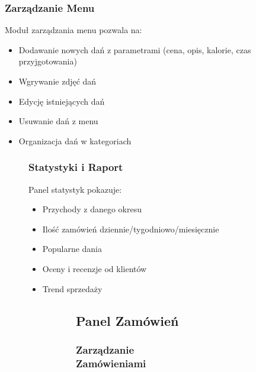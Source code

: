 \documentclass[12pt,a4paper,utf-8]{article}
\begin{document}
\begin{figure}[H]
    \centering

\subsubsection{Zarządzanie Menu}

Moduł zarządzania menu pozwala na:

\begin{itemize}
    \item Dodawanie nowych dań z parametrami (cena, opis, kalorie, czas przyjgotowania)
    \item Wgrywanie zdjęć dań
    \item Edycję istniejących dań
    \item Usuwanie dań z menu
    \item Organizacja dań w kategoriach
\end{itemize}

\begin{figure}[H]
    \centering

\subsubsection{Statystyki i Raport}

Panel statystyk pokazuje:

\begin{itemize}
    \item Przychody z danego okresu
    \item Ilość zamówień dziennie/tygodniowo/miesięcznie
    \item Popularne dania
    \item Oceny i recenzje od klientów
    \item Trend sprzedaży
\end{itemize}

\begin{figure}[H]
    \centering

\begin{figure}[H]
    \centering

\subsection{Panel Zamówień}

\subsubsection{Zarządzanie Zamówieniami}


\end{figure}
\end{figure}
\end{figure}
\end{figure}
\end{document}
